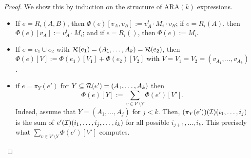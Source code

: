 \begin{proof}
We show this by induction on the structure of ARA$(k)$ expressions.
\begin{itemize}
\item If $e=R_i(A,B)$, then $\Phi(e)[v_A,v_B]:=v_A^t\cdot M_i\cdot v_B$; if $e=R_i(A)$, then $\Phi(e)[v_A]:=v_A^t\cdot M_i$; and if 
$e=R_i()$, then $\Phi(e):=M_i$.
\item If $e=e_1\cup e_2$ with $\mathcal{R}(e_1)=(A_1,\ldots,A_k)=\mathcal{R}(e_2)$, then 
$\Phi(e)[V]:=\Phi(e_1)[V_1]+\Phi(e_2)[V_2]$ with $V=V_1=V_2=(v_{A_1},\ldots,v_{A_k})$.
\item if $e=\pi_{Y}(e')$ for $Y\subseteq \mathcal{R}(e')=(A_1,\ldots,A_k)$ then 
$$
\Phi(e)[Y]:=\sum_{v\in V'\setminus Y} \Phi(e')[V'].
$$
Indeed, assume that $Y=(A_1,\ldots,A_j)$ for $j<k$. Then,
$(\pi_Y(e'))(\mathcal{I})(i_1,\ldots,i_j)$ is the sum of  $e'(\mathcal{I})(i_1,\ldots,i_j,\ldots,i_k)$
for all possible $i_{j+1},\ldots, i_k$. This precisely what $\sum_{v\in V'\setminus Y} \Phi(e')[V']$ computes.


\end{itemize}
\end{proof}
